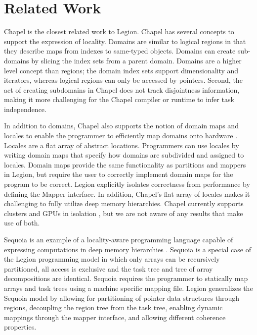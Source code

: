 
\section{Related Work}

Chapel \cite{Chamberlain:Chapel} is the closest related work to Legion.  
Chapel has several concepts to support the expression of locality.  
Domains are similar to logical regions in that they describe maps from indexes
to same-typed objects.  Domains can create sub-domains by slicing the index sets from
a parent domain.  Domains are a higher level concept than regions; the domain index sets 
support dimensionality and iterators, whereas  logical regions can only be accessed by pointers.  
Second, the act of creating subdomains in Chapel does not track disjointness information,
making it more challenging for the Chapel compiler or runtime to infer task independence.

In addition to domains, Chapel also supports the notion of domain maps and locales to enable 
the programmer to efficiently map domains onto hardware \cite{CHAPEL11}.  Locales are a flat array
of abstract locations.  Programmers can use locales by writing domain maps that specify
how domains are subdivided and assigned to locales.  Domain maps provide the same functionality
as partitions and mappers in Legion, but require the user to correctly implement domain
maps for the program to be correct.  Legion explicitly isolates correctness
from performance by defining the Mapper interface.  In addition, Chapel's flat array of locales
makes it challenging to fully utilize deep memory hierarchies.  Chapel currently supports
clusters and GPUs in isolation \cite{CHAPELGPU}, but we are not aware of any results that 
make use of both.

Sequoia is an example of a locality-aware programming language capable
of expressing computations in deep memory hierarchies
\cite{Fatahalian06}.  Sequoia is a special case of the Legion
programming model in which only arrays can be recursively partitioned,
all access is exclusive and the task tree and tree of array
decompositions are identical.  Sequoia requires the programmer to
statically map arrays and task trees using a machine specific mapping
file.  Legion generalizes the Sequoia model by allowing for
partitioning of pointer data structures through regions, decoupling
the region tree from the task tree, enabling dynamic mappings through
the mapper interface, and allowing different coherence
properties. 


